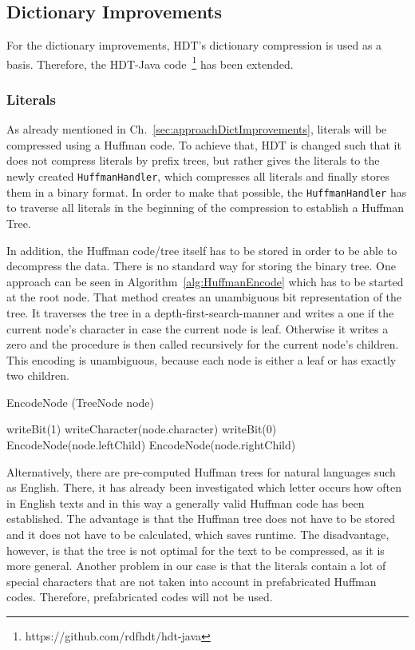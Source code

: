 \subsection{Dictionary Improvements}\label{sec:implementationDictImprovements}

For the dictionary improvements, HDT's dictionary compression is used as a basis. Therefore, the HDT-Java code~\footnote{https://github.com/rdfhdt/hdt-java} has been extended.

\subsubsection{Literals}\label{sec:implementationLiterals}

As already mentioned in Ch.~\ref{sec:approachDictImprovements}, literals will be compressed using a Huffman code. To achieve that, HDT is changed such that it does not compress literals by prefix trees, but rather gives the literals to the newly created {\tt HuffmanHandler}, which compresses all literals and finally stores them in a binary format. In order to make that possible, the {\tt HuffmanHandler} has to traverse all literals in the beginning of the compression to establish a Huffman Tree.

In addition, the Huffman code/tree itself has to be stored in order to be able to decompress the data. There is no standard way for storing the binary tree. One approach can be seen in Algorithm~\ref{alg:HuffmanEncode} which has to be started at the root node. That method creates an unambiguous bit representation of the tree. It traverses the tree in a depth-first-search-manner and writes a one if the current node's character in case the current node is leaf. Otherwise it writes a zero and the procedure is then called recursively for the current node's children. This encoding is unambiguous, because each node is either a leaf or has exactly two children.

\begin{algorithm}
	\caption{EncodeNode (TreeNode node)}\label{alg:HuffmanEncode}
	\begin{algorithmic}[1]
		\State writeBit(1)
		\State writeCharacter(node.character)
		\Else
		\State writeBit(0)
		\State EncodeNode(node.leftChild)
		\State EncodeNode(node.rightChild)
		\EndIf
	\end{algorithmic}
\end{algorithm}


Alternatively, there are pre-computed Huffman trees for natural languages such as English. There, it has already been investigated which letter occurs how often in English texts and in this way a generally valid Huffman code has been established. The advantage is that the Huffman tree does not have to be stored and it does not have to  be calculated, which saves runtime. The disadvantage, however, is that the tree is not optimal for the text to be compressed, as it is more general. Another problem in our case is that the literals contain a lot of special characters that are not taken into account in prefabricated Huffman codes. Therefore, prefabricated codes will not be used.

